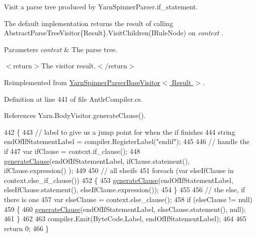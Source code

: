 Visit a parse tree produced by Yarn\-Spinner\-Parser.\-if\-\_\-statement. 

The default implementation returns the result of calling Abstract\-Parse\-Tree\-Visitor\{\-Result\}.\-Visit\-Children(\-I\-Rule\-Node) on {\itshape context} . 


\begin{DoxyParams}{Parameters}
{\em context} & The parse tree.\\
\hline
\end{DoxyParams}
$<$return$>$The visitor result.$<$/return$>$ 

Reimplemented from \hyperlink{a00191_a005f9655da52de2581762a4b61912ecd}{Yarn\-Spinner\-Parser\-Base\-Visitor$<$ Result $>$}.



Definition at line 441 of file Antlr\-Compiler.\-cs.



References Yarn.\-Body\-Visitor.\-generate\-Clause().


\begin{DoxyCode}
442         \{
443             \textcolor{comment}{// label to give us a jump point for when the if finishes}
444             \textcolor{keywordtype}{string} endOfIfStatementLabel = compiler.RegisterLabel(\textcolor{stringliteral}{"endif"});
445 
446             \textcolor{comment}{// handle the if}
447             var ifClause = context.if\_clause();
448             \hyperlink{a00038_a5f246aeaea2ba795d78abb0f8918cca4}{generateClause}(endOfIfStatementLabel, ifClause.statement(), ifClause.expression()
      );
449 
450             \textcolor{comment}{// all elseifs}
451             \textcolor{keywordflow}{foreach} (var elseIfClause \textcolor{keywordflow}{in} context.else\_if\_clause())
452             \{
453                 \hyperlink{a00038_a5f246aeaea2ba795d78abb0f8918cca4}{generateClause}(endOfIfStatementLabel, elseIfClause.statement(), 
      elseIfClause.expression());
454             \}
455 
456             \textcolor{comment}{// the else, if there is one}
457             var elseClause = context.else\_clause();
458             \textcolor{keywordflow}{if} (elseClause != null)
459             \{
460                 \hyperlink{a00038_a5f246aeaea2ba795d78abb0f8918cca4}{generateClause}(endOfIfStatementLabel, elseClause.statement(), null);
461             \}
462 
463             compiler.Emit(ByteCode.Label, endOfIfStatementLabel);
464 
465             \textcolor{keywordflow}{return} 0;
466         \}
\end{DoxyCode}


